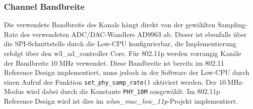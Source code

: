 \documentclass[letterpaper,11pt]{article}
\begin{document}
\begin{onehalfspace}
\subsubsection{Channel Bandbreite}\label{channel-bandbreite}

Die verwendete Bandbreite des Kanals hängt direkt von der gewählten
Sampling-Rate des verwendeten ADC/DAC-Wandlers AD9963 ab. Dieser ist
ebenfalls über die SPI-Schnittstelle durch die Low-CPU konfigurierbar,
die Implementierung erfolgt über den w3\_ad\_controller Core.
Für 802.11p werden vorrangig Kanäle der Bandbreite
\(\SI{10}{\mega\hertz}\) verwendet. Diese Bandbreite ist bereits im
802.11 Reference Design implementiert, muss jedoch in der Software der
Low-CPU durch einen Aufruf der Funktion \texttt{set\_phy\_samp\_rate()}
aktiviert werden. Der \(\SI{10}{\mega\hertz}\)-Modus wird dabei durch
die Konstante \texttt{PHY\_10M} ausgewählt.
Im 802.11p Reference Design wird ist dies im
\emph{wlan\_mac\_low\_11p}-Projekt implementiert.


\end{onehalfspace}
\end{document}
